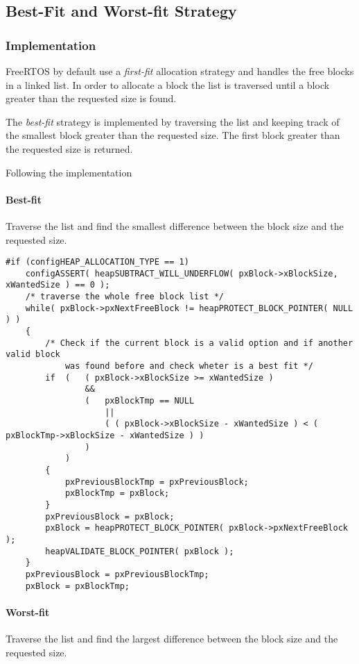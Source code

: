 \subsection{Best-Fit and Worst-fit Strategy}
    \subsubsection{Implementation}
    FreeRTOS by default use a \textit{first-fit} allocation strategy and handles the free blocks in a linked list. In order to allocate a block the list is traversed until a block greater than the requested size is found. 

    The \textit{best-fit} strategy is implemented by traversing the list and keeping track of the smallest block greater than the requested size. The first block greater than the requested size is returned.

    Following the implementation

    \paragraph{Best-fit} Traverse the list and find the smallest difference between the block size and the requested size.

    \begin{codebox}
    \begin{lstlisting}
#if (configHEAP_ALLOCATION_TYPE == 1)
    configASSERT( heapSUBTRACT_WILL_UNDERFLOW( pxBlock->xBlockSize, xWantedSize ) == 0 );
    /* traverse the whole free block list */
    while( pxBlock->pxNextFreeBlock != heapPROTECT_BLOCK_POINTER( NULL ) )
    {
        /* Check if the current block is a valid option and if another valid block
            was found before and check wheter is a best fit */
        if  (   ( pxBlock->xBlockSize >= xWantedSize )
                &&
                (   pxBlockTmp == NULL
                    ||
                    ( ( pxBlock->xBlockSize - xWantedSize ) < ( pxBlockTmp->xBlockSize - xWantedSize ) )
                )
            )
        {
            pxPreviousBlockTmp = pxPreviousBlock;
            pxBlockTmp = pxBlock;
        }
        pxPreviousBlock = pxBlock;
        pxBlock = heapPROTECT_BLOCK_POINTER( pxBlock->pxNextFreeBlock );
        heapVALIDATE_BLOCK_POINTER( pxBlock );
    }
    pxPreviousBlock = pxPreviousBlockTmp;
    pxBlock = pxBlockTmp;
    \end{lstlisting}
    \end{codebox}

    \paragraph{Worst-fit} Traverse the list and find the largest difference between the block size and the requested size.

